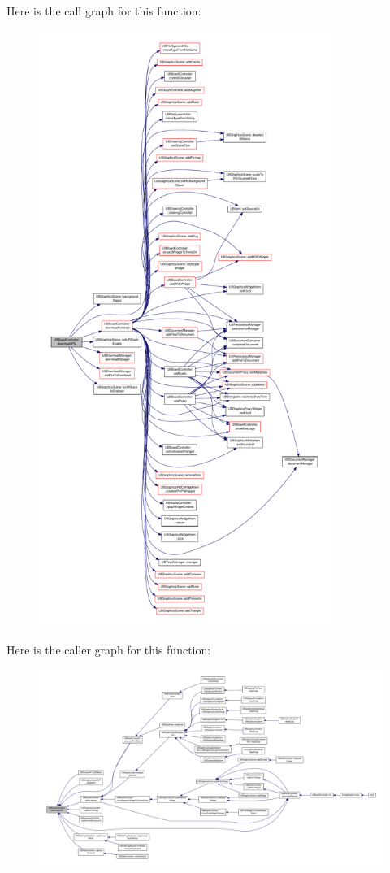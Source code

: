 Here is the call graph for this function\-:
\nopagebreak
\begin{figure}[H]
\begin{center}
\leavevmode
\includegraphics[height=550pt]{d7/d62/class_u_b_board_controller_a358f3f88d1fa9e41620170d76a806f93_cgraph}
\end{center}
\end{figure}




Here is the caller graph for this function\-:
\nopagebreak
\begin{figure}[H]
\begin{center}
\leavevmode
\includegraphics[width=350pt]{d7/d62/class_u_b_board_controller_a358f3f88d1fa9e41620170d76a806f93_icgraph}
\end{center}
\end{figure}


